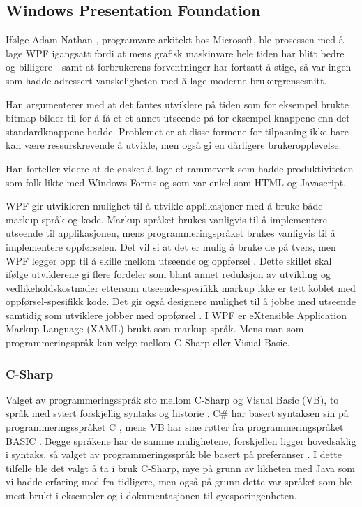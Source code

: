  
\subsection{Windows Presentation Foundation} 
 
Ifølge Adam Nathan \cite[p.~9]{WPFbook}, programvare arkitekt hos Microsoft, ble prosessen med å lage WPF igangsatt fordi at mens grafisk maskinvare hele tiden har blitt bedre og billigere - samt at forbrukerens forventninger har fortsatt å stige, så var ingen som hadde adressert vanskeligheten med å lage moderne brukergrensesnitt.  

Han argumenterer med at det fantes utviklere på tiden som for eksempel brukte bitmap bilder til for å få et et annet utseende på for eksempel knappene enn det standardknappene hadde. Problemet er at disse formene for tilpasning ikke bare kan være ressurskrevende å utvikle, men også gi en dårligere brukeropplevelse. 

Han forteller videre at de ønsket å lage et rammeverk som hadde produktiviteten som folk likte med Windows Forms og som var enkel som HTML og Javascript.

WPF gir utvikleren mulighet til å utvikle applikasjoner med å bruke både markup språk og kode. Markup språket brukes vanligvis til å implementere utseende til applikasjonen, mens programmeringspråket brukes vanligvis til å implementere oppførselen. Det vil si at det er mulig å bruke de på tvers, men WPF legger opp til å skille mellom utseende og oppførsel \cite{Intro8:online}. Dette skillet skal ifølge utviklerene gi flere fordeler som blant annet reduksjon av utvikling og vedlikeholdskostnader ettersom utseende-spesifikk markup ikke er tett koblet med oppførsel-spesifikk kode. Det gir også designere mulighet til å jobbe med utseende samtidig som utviklere jobber med oppførsel \cite{Intro8:online}. I WPF er eXtensible Application Markup Language (XAML) brukt som markup språk. Mens man som programmeringspråk kan velge mellom C-Sharp eller Visual Basic.

\subsubsection{C-Sharp} 

Valget av programmeringsspråk sto mellom C-Sharp og Visual Basic (VB), to språk med svært forskjellig syntaks og historie \cite{Compa6:online}. C# har basert syntaksen sin på programmeringsspråket C , mens VB har sine røtter fra programmeringspråket BASIC \cite{Visua3:online} \cite{About8:online}. Begge språkene har de samme mulighetene, forskjellen ligger hovedsaklig i syntaks, så valget av programmeringsspråk ble basert på preferanser \cite{What0:online}. I dette tilfelle ble det valgt å ta i bruk C-Sharp, mye på grunn av likheten med Java som vi hadde erfaring med fra tidligere, men også på grunn dette var språket som ble mest brukt i eksempler og i dokumentasjonen til øyesporingenheten.


